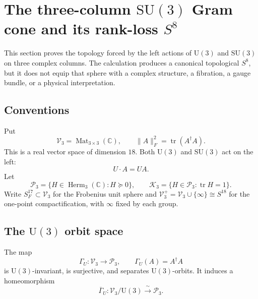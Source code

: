 \section{The three-column \texorpdfstring{\(\mathrm{SU}(3)\)}{SU(3)}
Gram cone and its rank-loss \texorpdfstring{\(S^8\)}{S8}}
\label{sec:hr3c-main}

This section proves the topology forced by the left actions of
\(\mathrm U(3)\) and \(\mathrm{SU}(3)\) on three complex columns.  The
calculation produces a canonical topological \(S^8\), but it does not
equip that sphere with a complex structure, a fibration, a gauge bundle,
or a physical interpretation.

\subsection{Conventions}
\label{subsec:hr3c-conventions}

Put
\begin{equation}
 \mathscr V_3=\operatorname{Mat}_{3\times3}(\mathbb C),
 \qquad
 \lVert A\rVert_F^2=\operatorname{tr}(A^\dagger A).
 \label{eq:hr3c-source}
\end{equation}
This is a real vector space of dimension \(18\).  Both
\(\mathrm U(3)\) and \(\mathrm{SU}(3)\) act on the left:
\begin{equation}
 U\cdot A=UA.
 \label{eq:hr3c-left-action}
\end{equation}
Let
\begin{equation}
 \mathcal P_3=
 \{H\in\operatorname{Herm}_3(\mathbb C):H\succeq0\},
 \qquad
 \mathcal K_3=
 \{H\in\mathcal P_3:\operatorname{tr}H=1\}.
 \label{eq:hr3c-gram-cone-slice}
\end{equation}
Write \(S^{17}_F\subset\mathscr V_3\) for the Frobenius unit sphere and
\(\mathscr V_3^+=\mathscr V_3\cup\{\infty\}\cong S^{18}\) for the
one-point compactification, with \(\infty\) fixed by each group.

\subsection{The \texorpdfstring{\(\mathrm U(3)\)}{U(3)} orbit space}
\label{subsec:hr3c-u3}

\begin{theorem}
\label{thm:hr3c-u3-gram-classification}
The map
\begin{equation}
 \Gamma_U:\mathscr V_3\longrightarrow\mathcal P_3,
 \qquad
 \Gamma_U(A)=A^\dagger A
 \label{eq:hr3c-u3-gram-map}
\end{equation}
is \(\mathrm U(3)\)-invariant, is surjective, and separates
\(\mathrm U(3)\)-orbits.  It induces a homeomorphism
\begin{equation}
 \overline\Gamma_U:
 \mathscr V_3/\mathrm U(3)\xrightarrow{\ \sim\ }\mathcal P_3.
 \label{eq:hr3c-u3-quotient-homeomorphism}
\end{equation}
\end{theorem}

